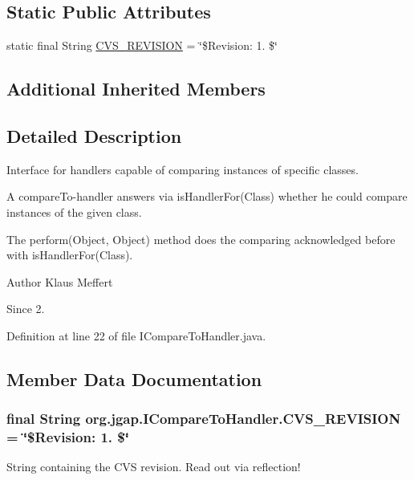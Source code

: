\subsection*{Static Public Attributes}
\begin{DoxyCompactItemize}
\item 
static final String \hyperlink{interfaceorg_1_1jgap_1_1_i_compare_to_handler_a1f773d8bc933d985f0e90564bba94266}{C\-V\-S\-\_\-\-R\-E\-V\-I\-S\-I\-O\-N} = \char`\"{}\$Revision\-: 1. \$\char`\"{}
\end{DoxyCompactItemize}
\subsection*{Additional Inherited Members}


\subsection{Detailed Description}
Interface for handlers capable of comparing instances of specific classes. 

A compare\-To-\/handler answers via is\-Handler\-For(\-Class) whether he could compare instances of the given class.

The perform(\-Object, Object) method does the comparing acknowledged before with is\-Handler\-For(\-Class).

\begin{DoxyAuthor}{Author}
Klaus Meffert 
\end{DoxyAuthor}
\begin{DoxySince}{Since}
2. 
\end{DoxySince}


Definition at line 22 of file I\-Compare\-To\-Handler.\-java.



\subsection{Member Data Documentation}
\hypertarget{interfaceorg_1_1jgap_1_1_i_compare_to_handler_a1f773d8bc933d985f0e90564bba94266}{
\subsubsection[{C\-V\-S\-\_\-\-R\-E\-V\-I\-S\-I\-O\-N}]{\setlength{\rightskip}{0pt plus 5cm}final String org.\-jgap.\-I\-Compare\-To\-Handler.\-C\-V\-S\-\_\-\-R\-E\-V\-I\-S\-I\-O\-N = \char`\"{}\$Revision\-: 1. \$\char`\"{}\hspace{0.3cm}{\ttfamily [static]}}}\label{interfaceorg_1_1jgap_1_1_i_compare_to_handler_a1f773d8bc933d985f0e90564bba94266}
String containing the C\-V\-S revision. Read out via reflection! 

